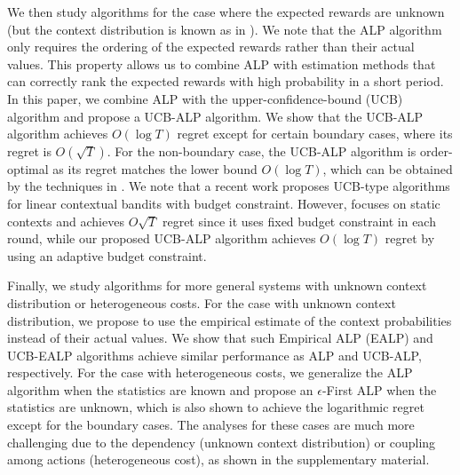 {We then study algorithms for the case where the expected rewards are unknown (but the context distribution is known as in \cite{Badanidiyuru2014COLT}).
We note that the ALP algorithm only requires the ordering of the expected rewards rather than their actual values.
This property allows us to combine  ALP with estimation methods that can correctly rank the expected rewards with high probability in a short period. In this paper, we combine ALP with
the upper-confidence-bound (UCB) algorithm \cite{Auer2002ML:UCB} and propose a UCB-ALP algorithm.
We show that  the UCB-ALP algorithm achieves $O(\log T)$ regret except for certain boundary cases, where its regret is $O(\sqrt{T})$.
For the non-boundary case, the UCB-ALP algorithm is order-optimal as its regret matches the lower bound $O(\log T)$, which can be obtained by the techniques in \cite{Lai1985AAM}. We note that a recent work \cite{Agrawal2014EC} proposes UCB-type algorithms  for linear contextual bandits with budget constraint. However, \cite{Agrawal2014EC} focuses on static contexts and achieves $O{\sqrt{T}}$ regret since it uses fixed budget constraint in each round, while our proposed UCB-ALP algorithm achieves $O(\log T)$ regret by using an adaptive budget constraint.


Finally, we study algorithms for more general systems with unknown context distribution or heterogeneous costs. For the case with unknown context distribution, we propose to use the empirical estimate of the context probabilities instead of their actual values. We show that such Empirical ALP (EALP) and UCB-EALP algorithms achieve similar performance as ALP and UCB-ALP, respectively. For the case with heterogeneous costs, we generalize the ALP algorithm when the statistics are known and  propose an $\epsilon$-First ALP when the statistics are unknown, which is also shown to achieve the logarithmic regret except for the boundary cases. The analyses for these cases are much more challenging due to the dependency (unknown context distribution) or coupling among actions (heterogeneous cost), as shown in the supplementary material.

}
